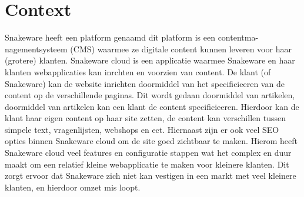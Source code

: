 \section{Context}
Snakeware heeft een platform genaamd  dit platform is een contentma-
nagementsysteem (CMS) waarmee ze digitale content kunnen leveren voor haar (grotere) klanten.
Snakeware cloud is een applicatie waarmee Snakeware en haar klanten webapplicaties kan inrchten en voorzien van content.
\whitespace
De klant (of Snakeware) kan de website inrichten doormiddel van het specificieeren van de content op de verschillende paginas.
Dit wordt gedaan doormiddel van artikelen, doormiddel van artikelen kan een klant de content specificieeren.
Hierdoor kan de klant haar eigen content op haar site zetten, de content kan verschillen tussen simpele text, vragenlijsten, webshops en ect.
Hiernaast zijn er ook veel SEO opties binnen Snakeware cloud om de site goed zichtbaar te maken.
Hierom heeft Snakeware cloud veel features en configuratie stappen wat het complex en duur maakt om een relatief kleine webapplicatie te maken voor kleinere klanten.
\whitespace
Dit zorgt ervoor dat Snakeware zich niet kan vestigen in een markt met veel kleinere klanten,
en hierdoor omzet mis loopt.


